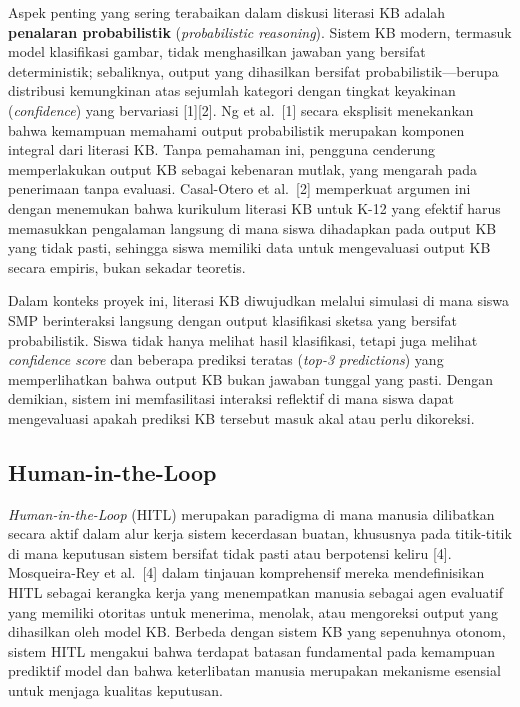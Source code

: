 Aspek penting yang sering terabaikan dalam diskusi literasi KB adalah \textbf{penalaran probabilistik} (\textit{probabilistic reasoning}). Sistem KB modern, termasuk model klasifikasi gambar, tidak menghasilkan jawaban yang bersifat deterministik; sebaliknya, output yang dihasilkan bersifat probabilistik---berupa distribusi kemungkinan atas sejumlah kategori dengan tingkat keyakinan (\textit{confidence}) yang bervariasi [1][2]. Ng et al.\ [1] secara eksplisit menekankan bahwa kemampuan memahami output probabilistik merupakan komponen integral dari literasi KB. Tanpa pemahaman ini, pengguna cenderung memperlakukan output KB sebagai kebenaran mutlak, yang mengarah pada penerimaan tanpa evaluasi. Casal-Otero et al.\ [2] memperkuat argumen ini dengan menemukan bahwa kurikulum literasi KB untuk K-12 yang efektif harus memasukkan pengalaman langsung di mana siswa dihadapkan pada output KB yang tidak pasti, sehingga siswa memiliki data untuk mengevaluasi output KB secara empiris, bukan sekadar teoretis.

Dalam konteks proyek ini, literasi KB diwujudkan melalui simulasi di mana siswa SMP berinteraksi langsung dengan output klasifikasi sketsa yang bersifat probabilistik. Siswa tidak hanya melihat hasil klasifikasi, tetapi juga melihat \textit{confidence score} dan beberapa prediksi teratas (\textit{top-3 predictions}) yang memperlihatkan bahwa output KB bukan jawaban tunggal yang pasti. Dengan demikian, sistem ini memfasilitasi interaksi reflektif di mana siswa dapat mengevaluasi apakah prediksi KB tersebut masuk akal atau perlu dikoreksi.

\subsection{Human-in-the-Loop}
\label{subsec:hitl}

\textit{Human-in-the-Loop} (HITL) merupakan paradigma di mana manusia dilibatkan secara aktif dalam alur kerja sistem kecerdasan buatan, khususnya pada titik-titik di mana keputusan sistem bersifat tidak pasti atau berpotensi keliru [4]. Mosqueira-Rey et al.\ [4] dalam tinjauan komprehensif mereka mendefinisikan HITL sebagai kerangka kerja yang menempatkan manusia sebagai agen evaluatif yang memiliki otoritas untuk menerima, menolak, atau mengoreksi output yang dihasilkan oleh model KB. Berbeda dengan sistem KB yang sepenuhnya otonom, sistem HITL mengakui bahwa terdapat batasan fundamental pada kemampuan prediktif model dan bahwa keterlibatan manusia merupakan mekanisme esensial untuk menjaga kualitas keputusan.

